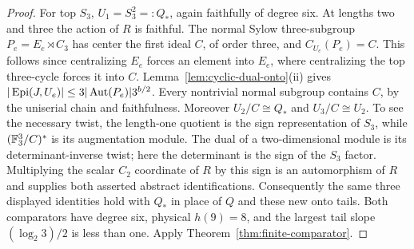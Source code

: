 \begin{proof}
For top $S_3$, $U_1=S_3^2=:Q_*$, again faithfully of degree six.
At lengths two and three the action of $R$ is faithful. The normal
Sylow three-subgroup $P_e=E_e\rtimes C_3$ has center the first
ideal $C$, of order three, and $C_{U_e}(P_e)=C$. This follows
since centralizing $E_e$ forces an element into $E_e$, where
centralizing the top three-cycle forces it into $C$.
Lemma~\ref{lem:cyclic-dual-onto}(ii) gives
$|\operatorname{Epi}(J,U_e)|\leq3|\operatorname{Aut}(P_e)|3^{b/2}$.
Every nontrivial normal subgroup contains $C$, by the uniserial
chain and faithfulness. Moreover $U_2/C\cong Q_*$ and
$U_3/C\cong U_2$. To see the necessary twist, the length-one
quotient is the sign representation of $S_3$, while
$(\mathbb F_3^3/C)^*$ is its augmentation module. The dual of a
two-dimensional module is its determinant-inverse twist; here the
determinant is the sign of the $S_3$ factor. Multiplying the scalar
$C_2$ coordinate of $R$ by this sign is an automorphism of $R$
and supplies both asserted abstract identifications. Consequently
the same three displayed identities hold with $Q_*$ in place of
$Q$ and these new onto tails.
Both comparators have degree six, physical $h(9)=8$, and the
largest tail slope $(\log_2 3)/2$ is less than one. Apply
Theorem~\ref{thm:finite-comparator}.
\end{proof}

